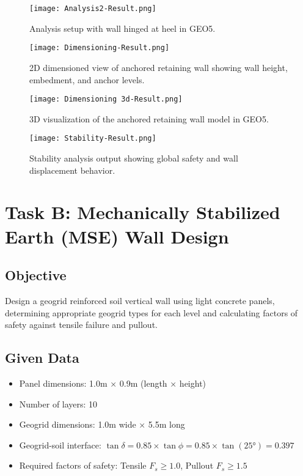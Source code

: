 \documentclass[10pt,a4paper,twocolumn]{article}
\begin{document}
\begin{figure}[H]
    \centering
    \texttt{[image: Analysis2-Result.png]}
    \caption{Analysis setup with wall hinged at heel in GEO5.}
    \label{fig:wall_hinged_heel}
\end{figure}
\begin{figure}[H]
    \centering
    \texttt{[image: Dimensioning-Result.png]}
    \caption{2D dimensioned view of anchored retaining wall showing wall height, embedment, and anchor levels.}
    \label{fig:wall_dimensioning}
\end{figure}
\begin{figure}[H]
    \centering
    \texttt{[image: Dimensioning 3d-Result.png]}
    \caption{3D visualization of the anchored retaining wall model in GEO5.}
    \label{fig:wall_3d_view}
\end{figure}
\begin{figure}[H]
    \centering
    \texttt{[image: Stability-Result.png]}
    \caption{Stability analysis output showing global safety and wall displacement behavior.}
    \label{fig:stability_analysis}
\end{figure}


\newpage

\section{Task B: Mechanically Stabilized Earth (MSE) Wall Design}

\subsection{Objective}
Design a geogrid reinforced soil vertical wall using light concrete panels, determining appropriate geogrid types for each level and calculating factors of safety against tensile failure and pullout.

\subsection{Given Data}
\begin{itemize}
\item Panel dimensions: 1.0m × 0.9m (length × height)
\item Number of layers: 10
\item Geogrid dimensions: 1.0m wide × 5.5m long
\item Geogrid-soil interface: $\tan\delta = 0.85 \times \tan\phi = 0.85 \times \tan(25°) = 0.397$
\item Required factors of safety: Tensile $F_s \geq 1.0$, Pullout $F_s \geq 1.5$
\end{itemize}
\end{document}
